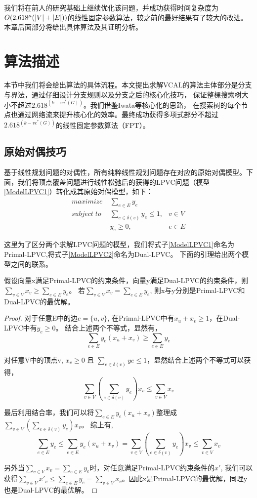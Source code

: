我们将在前人的研究基础上继续优化该问题，并成功获得时间复杂度为$O(2.618^{\mu}(\left\vert V \right\vert + \left\vert E \right\vert))$的线性固定参数算法，较之前的最好结果有了较大的改进。
本章后面部分将给出具体算法及其证明分析。


\section{算法描述}
本节中我们将会给出算法的具体流程。本文提出求解VCAL的算法主体部分是分支与界法，通过仔细设计分支规则以及分支之后的核心化技巧，
保证整棵搜索树大小不超过$2.618^(k-vc^*(G))$。我们借鉴Iwata等核心化的思路，
在搜索树的每个节点也通过网络流来提升核心化的效率。最终成功获得多项式部分不超过$2.618^(k-vc^*(G))$的线性固定参数算法（FPT）。
\subsection{原始对偶技巧}
基于线性规划问题的对偶性，所有纯粹线性规划问题存在对应的原始对偶模型。下面，我们将顶点覆盖问题进行线性松弛后的获得的LPVC问题（模型\ref{ModelLPVC1}）转化成其原始对偶模型，如下：
\begin{equation} \label{ModelLPVC2} \begin{aligned}
  maximize\; & \sum_{e \in E}{y_e} &\\
  subject\; to\; & \sum_{e \in \delta(v)}{y_e \le 1}, & v \in V \\
   & y_e \ge 0, & e \in E
\end{aligned} \end{equation}

这里为了区分两个求解LPVC问题的模型，我们将式子\ref{ModelLPVC1}命名为Primal-LPVC,将式子\ref{ModelLPVC2}命名为Dual-LPVC。
下面的引理给出两个模型之间的联系。
\begin{lemma}
假设向量x满足Primal-LPVC的约束条件，向量y满足Dual-LPVC的约束条件，则$\sum\limits_{v \in V}{x_v} \ge \sum\limits_{e \in E}{y_e}$。
若$\sum\limits_{v \in V}{x_v} = \sum\limits_{e \in E}{y_e}$, 则x与y分别是Primal-LPVC和Dual-LPVC的最优解。
\end{lemma}
\begin{proof}
  对于任意E中的边$e = \{u, v\}$, 在Primal-LPVC中有$x_u + x_v \ge 1$，在Dual-LPVC中有$y_e \ge 0$。
  结合上述两个不等式，显然有，\[\sum\limits_{e \in E}{y_e(x_u + x_v)} \ge \sum\limits_{e \in E}{y_e}\]
  
  对任意V中的顶点v, $x_v \ge 0$ 且 $\sum_{e \in \delta(v)}{ye} \le 1$，显然结合上述两个不等式可以获得，
  \[\sum\limits_{v \in V}{(\sum\limits_{e \in \delta(v)}{y_e})x_v} \le \sum\limits_{v \in V}{x_v}\]
  
  最后利用结合率，我们可以将$\sum_{e \in E}{y_e(x_u + x_v)}$整理成$\sum_{v \in V}{(\sum_{e \in \delta(v)}{y_e})x_v}$。  
  综上有,
  \[
    \sum_{e \in E}{y_e} \le \sum_{e \in E}{y_e(x_u + x_v)}  = \sum_{v \in V}{(\sum_{e \in \delta(v)}{y_e})x_v} \le \sum_{v \in V}{x_v}
  \]
  
  另外当$\sum\limits_{v \in V}{x_v} = \sum\limits_{e \in E}{y_e}$时，对任意满足Primal-LPVC约束条件的$x'$, 
  我们可以获得$\sum\limits_{v \in V}{x'_v} \le \sum\limits_{e \in E}{y_e} = \sum\limits_{v \in V}{x_v}$。因此x是Primal-LPVC的最优解，同理y也是Dual-LPVC的最优解。
\end{proof}
